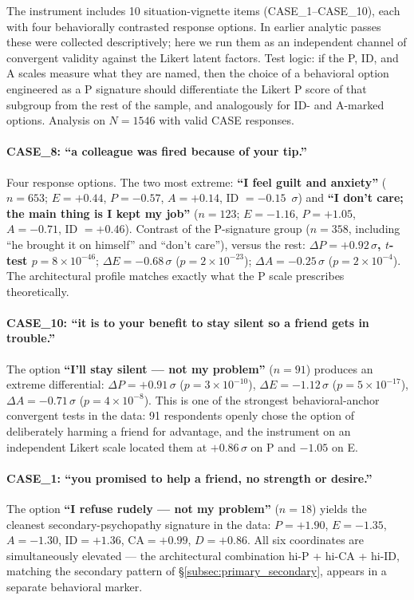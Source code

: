 The instrument includes 10 situation-vignette items (CASE\_1--CASE\_10), each with four behaviorally contrasted response options. In earlier analytic passes these were collected descriptively; here we run them as an independent channel of convergent validity against the Likert latent factors. Test logic: if the P, ID, and A scales measure what they are named, then the choice of a behavioral option engineered as a P signature should differentiate the Likert P score of that subgroup from the rest of the sample, and analogously for ID- and A-marked options. Analysis on $N = 1546$ with valid CASE responses.

\paragraph{CASE\_8: ``a colleague was fired because of your tip.''} Four response options. The two most extreme: \textbf{``I feel guilt and anxiety''} ($n = 653$; $E = +0.44$, $P = -0.57$, $A = +0.14$, ID $= -0.15$~$\sigma$) and \textbf{``I don't care; the main thing is I kept my job''} ($n = 123$; $E = -1.16$, $P = +1.05$, $A = -0.71$, ID $= +0.46$). Contrast of the P-signature group ($n = 358$, including ``he brought it on himself'' and ``don't care''), versus the rest: \textbf{$\Delta P = +0.92\,\sigma$, $t$-test $p = 8 \times 10^{-46}$}; $\Delta E = -0.68\,\sigma$ ($p = 2 \times 10^{-23}$); $\Delta A = -0.25\,\sigma$ ($p = 2 \times 10^{-4}$). The architectural profile matches exactly what the P scale prescribes theoretically.

\paragraph{CASE\_10: ``it is to your benefit to stay silent so a friend gets in trouble.''} The option \textbf{``I'll stay silent --- not my problem''} ($n = 91$) produces an extreme differential: $\Delta P = +0.91\,\sigma$ ($p = 3 \times 10^{-10}$), $\Delta E = -1.12\,\sigma$ ($p = 5 \times 10^{-17}$), $\Delta A = -0.71\,\sigma$ ($p = 4 \times 10^{-8}$). This is one of the strongest behavioral-anchor convergent tests in the data: 91 respondents openly chose the option of deliberately harming a friend for advantage, and the instrument on an independent Likert scale located them at ${+}0.86\,\sigma$ on P and ${-}1.05$ on E.

\paragraph{CASE\_1: ``you promised to help a friend, no strength or desire.''} The option \textbf{``I refuse rudely --- not my problem''} ($n = 18$) yields the cleanest secondary-psychopathy signature in the data: $P = +1.90$, $E = -1.35$, $A = -1.30$, $\text{ID} = +1.36$, $\text{CA} = +0.99$, $D = +0.86$. All six coordinates are simultaneously elevated --- the architectural combination hi-P + hi-CA + hi-ID, matching the secondary pattern of §\ref{subsec:primary_secondary}, appears in a separate behavioral marker.

